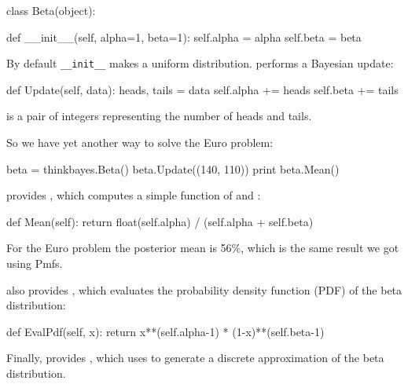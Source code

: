 \documentclass[12pt]{book}
\theoremstyle{exercise}
\begin{document}
\begin{code}
class Beta(object):

    def __init__(self, alpha=1, beta=1):
        self.alpha = alpha
        self.beta = beta
\end{code}

By default \verb"__init__" makes a uniform distribution.
 performs a Bayesian update:

\begin{code}
    def Update(self, data):
        heads, tails = data
        self.alpha += heads
        self.beta += tails
\end{code}

 is a pair of integers representing the number of
heads and tails.

So we have yet another way to solve the Euro problem:

\begin{code}
    beta = thinkbayes.Beta()
    beta.Update((140, 110))
    print beta.Mean()
\end{code}

 provides , which 
computes a simple function of 
and :

\begin{code}
    def Mean(self):
        return float(self.alpha) / (self.alpha + self.beta)
\end{code}

For the Euro problem the posterior mean is 56\%, which is the
same result we got using Pmfs.  

 also provides , which evaluates
the probability density
function (PDF)  of the beta distribution:

\begin{code}
    def EvalPdf(self, x):
        return x**(self.alpha-1) * (1-x)**(self.beta-1)
\end{code}

Finally,  provides , which
uses  to generate a discrete approximation
of the beta distribution.



\end{document}
